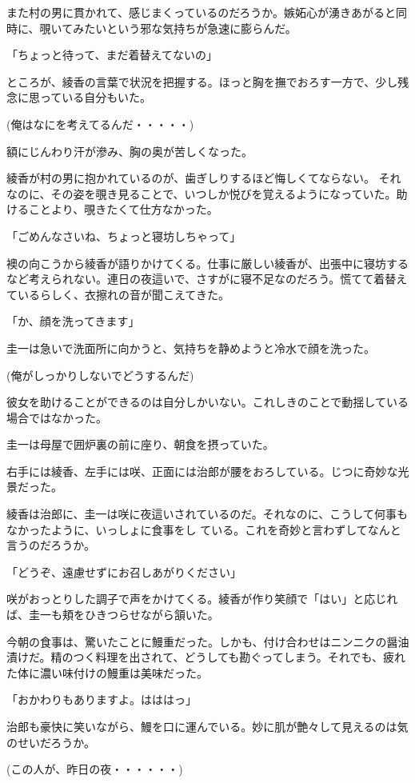 ﻿\documentclass[book,tate]{jlreq}
\begin{document}
また村の男に貫かれて、感じまくっているのだろうか。嫉妬心が湧きあがると同時に、覗いてみたいという邪な気持ちが急速に膨らんだ。

「ちょっと待って、まだ着替えてないの」

ところが、綾香の言葉で状況を把握する。ほっと胸を撫でおろす一方で、少し残念に思っている自分もいた。

(俺はなにを考えてるんだ・・・・・)

額にじんわり汗が滲み、胸の奥が苦しくなった。

綾香が村の男に抱かれているのが、歯ぎしりするほど悔しくてならない。 それなのに、その姿を覗き見ることで、いつしか悦びを覚えるようになっていた。助けることより、覗きたくて仕方なかった。

「ごめんなさいね、ちょっと寝坊しちゃって」

襖の向こうから綾香が語りかけてくる。仕事に厳しい綾香が、出張中に寝坊するなど考えられない。連日の夜這いで、さすがに寝不足なのだろう。慌てて着替えているらしく、衣擦れの音が聞こえてきた。

「か、顔を洗ってきます」

圭一は急いで洗面所に向かうと、気持ちを静めようと冷水で顔を洗った。

(俺がしっかりしないでどうするんだ)

彼女を助けることができるのは自分しかいない。これしきのことで動揺している場合ではなかった。

圭一は母屋で囲炉裏の前に座り、朝食を摂っていた。

右手には綾香、左手には咲、正面には治郎が腰をおろしている。じつに奇妙な光景だった。

綾香は治郎に、圭一は咲に夜這いされているのだ。それなのに、こうして何事もなかったように、いっしょに食事をし ている。これを奇妙と言わずしてなんと言うのだろうか。

「どうぞ、遠慮せずにお召しあがりください」

咲がおっとりした調子で声をかけてくる。綾香が作り笑顔で「はい」と応じれば、圭一も頬をひきつらせながら頷いた。

今朝の食事は、驚いたことに鰻重だった。しかも、付け合わせはニンニクの醤油漬けだ。精のつく料理を出されて、どうしても勘ぐってしまう。それでも、疲れた体に濃い味付けの鰻重は美味だった。

「おかわりもありますよ。はははっ」

治郎も豪快に笑いながら、鰻を口に運んでいる。妙に肌が艶々して見えるのは気のせいだろうか。

(この人が、昨日の夜・・・・・・)
\end{document}
